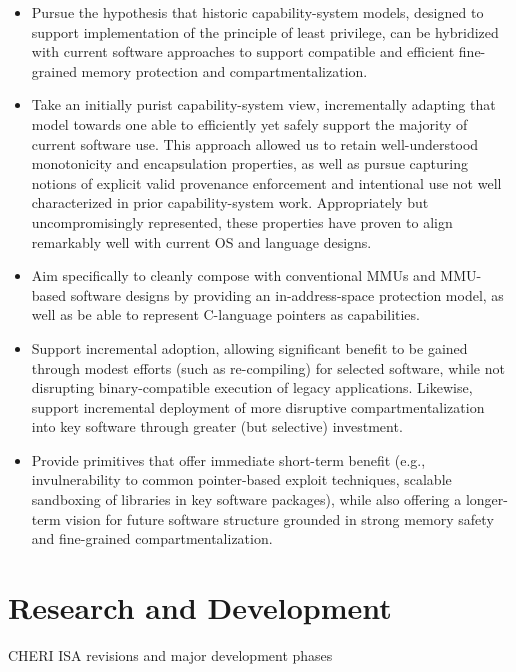 \begin{itemize}
\item Pursue the hypothesis that historic capability-system models, designed
  to support implementation of the principle of least privilege, can be
  hybridized with current software approaches to support compatible and
  efficient fine-grained memory protection and compartmentalization.

\item Take an initially purist capability-system view, incrementally adapting
  that model towards one able to efficiently yet safely support the majority
  of current software use.
  This approach allowed us to retain well-understood monotonicity and
  encapsulation properties, as well as pursue capturing notions of explicit
  valid provenance enforcement and intentional use not well characterized in
  prior capability-system work.
  Appropriately but uncompromisingly represented, these properties have proven
  to align remarkably well with current OS and language designs.

\item Aim specifically to cleanly compose with conventional MMUs and MMU-based
  software designs by providing an in-address-space protection model, as well
  as be able to represent C-language pointers as capabilities.

\item Support incremental adoption, allowing significant benefit to be gained
  through modest efforts (such as re-compiling) for selected software, while
  not disrupting binary-compatible execution of legacy applications.
  Likewise, support incremental deployment of more disruptive
  compartmentalization into key software through greater (but selective)
  investment.

\item Provide primitives that offer immediate short-term benefit (e.g.,
  invulnerability to common pointer-based exploit techniques, scalable
  sandboxing of libraries in key software packages), while also offering a
  longer-term vision for future software structure grounded in strong memory
  safety and fine-grained compartmentalization.
\end{itemize}

\section{Research and Development}
\label{sec:development}

\begin{table}[th]
\begin{center}
\caption{CHERI ISA revisions and major development phases}

\end{center}
\label{table:cheri-isa-versions}
\end{table}

